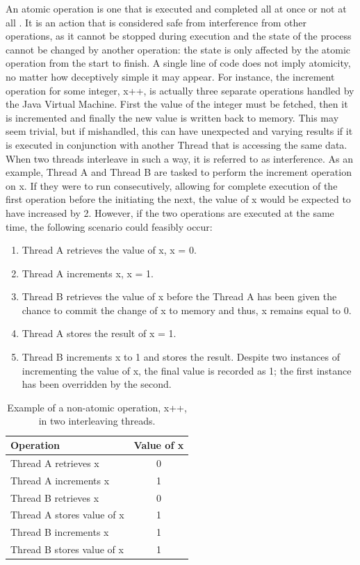 \documentclass[a4paper,12pt]{article}
\begin{document}
An atomic operation is one that is executed and completed all at once or not at all \citep{concurrency19}. It is an action that is considered safe from interference from other operations, as it cannot be stopped during execution and the state of the process cannot be changed by another operation: the state is only affected by the atomic operation from the start to finish. A single line of code does not imply atomicity, no matter how deceptively simple it may appear. For instance, the increment operation for some integer, x++, is actually three separate operations handled by the Java Virtual Machine. First the value of the integer must be fetched, then it is incremented and finally the new value is written back to memory. This may seem trivial, but if mishandled, this can have unexpected and varying results if it is executed in conjunction with another Thread that is accessing the same data. When two threads interleave in such a way, it is referred to as interference. As an example, Thread A and Thread B are tasked to perform the increment operation on x. If they were to run consecutively, allowing for complete execution of the first operation before the initiating the next, the value of x would be expected to have increased by 2. However, if the two operations are executed at the same time, the following scenario could feasibly occur:
\begin{enumerate}
    \item Thread A retrieves the value of x, x = 0.
    \item Thread A increments x, x = 1.
    \item Thread B retrieves the value of x before the Thread A has been given the chance to commit the change of x to memory and thus, x remains equal to 0.
    \item Thread A stores the result of x = 1.
    \item Thread B increments x to 1 and stores the result. Despite two instances of incrementing the value of x, the final value is recorded as 1; the first instance has been overridden by the second.
\end{enumerate}

\begin{table}[]
    \centering
    \begin{tabular}{||l c||} 
     \hline
     Operation & Value of x  \\ 
     \hline\hline
     Thread A retrieves x & 0 \\ 
     \hline
     Thread A increments x & 1  \\
     \hline
     Thread B retrieves x & 0 \\
     \hline
     Thread A stores value of x & 1 \\
     \hline
     Thread B increments x & 1 \\  
     \hline
     Thread B stores value of x & 1 \\
     \hline
    \end{tabular}
    \caption{Example of a non-atomic operation, x++, in two interleaving threads.}
    \label{table:non-atomic}
\end{table}
\end{document}
